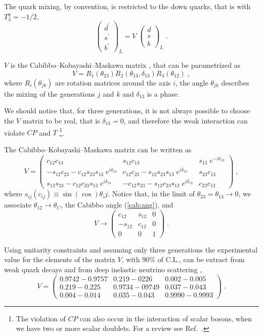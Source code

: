 \documentclass[12pt]{report}
\newcommand{\ba}{\begin{array}}
\newcommand{\ea}{\end{array}}
\begin{document}

The quark mixing, by convention, is restricted to the down quarks,
that is  with $T_3^q = -1/2$,
\[
\left( \ba{c}
d^\prime\\
s^\prime\\
b^\prime
\ea \right)_L  = V \; \left( \ba{c}
	      			d\\
	      	 		s\\
				b
             			 \ea \right)_L \; .
\]

$V$ is the Cabibbo--Kobayashi--Maskawa matrix
\cite{Cabibbo:63,Kobayashi:73}, that can be parame\-tri\-zed as
\[
V = R_1 (\theta_{23}) R_2(\theta_{13}, \delta_{13}) R_3(\theta_{12})
\; ,
\]
where $R_i(\theta_{jk})$ are rotation matrices around the axis $i$, 
the angle $\theta_{jk}$ describes the mixing of the generations $j$
and $k$ and $\delta_{13}$ is a phase. 

We should notice that, for three generations, it is not always
possible to choose the $V$ matrix to be real, that is $\delta_{13}
=0$, and therefore the weak interaction can violate $CP$ and $T$
\footnote{The violation of $CP$ can also occur in the interaction of
scalar bosons, when we have two or more scalar doublets. For a review
see Ref.\ \cite{Winstein:93}.}.

The Cabibbo--Kobayashi--Maskawa matrix can be written as
\[
V = \left( \ba{ccc}
 c_{12}c_{13}						&  
 s_{12}c_{13}						&   
 s_{13} \; e^{-i\delta_{13}}				\\
-s_{12}c_{23} - c_{12}s_{23}s_{13} \; e^{i\delta_{13}} 	& 
 c_{12}c_{23} - s_{12}s_{23}s_{13} \; e^{i\delta_{13}}	& 
 s_{23}c_{13}						\\
 s_{12}s_{23} - c_{12}c_{23}s_{13} \; e^{i\delta_{13}} 	&
-c_{12}s_{23} - s_{12}c_{23}s_{13} \; e^{i\delta_{13}}	&  
 c_{23}c_{13}	 
\ea \right) \; ,
\]
where $s_{ij}(c_{ij}) \equiv \sin (\cos) \theta_ij$. Notice that, in
the limit of $\theta_{23} = \theta_{13} \to 0$, we associate
$\theta_{12} \to \theta_{C}$, the Cabibbo angle (\ref{cab:ang}), and
\[
V \to 
\left( \ba{ccc}
 c_{12}		&  
 s_{12}		&   
 0		\\
-s_{12}  	& 
 c_{12}  	& 
 0		\\
 0		&
 0 		&  
 1	 
\ea \right) \; .
\]

Using unitarity constraints and assuming only three generations the
experimental value for the elements of the matrix $V$, with 90\% of
C.L., can be extract from weak quark decays and from deep inelastic
neutrino scattering \cite{pdg:98},
\[
V = \left( \ba{ccc}
 0.9742-0.9757	&  
 0.219-0226	&   
 0.002-0.005	\\
 0.219-0.225	& 
 0.9734-09749	& 
 0.037-0.043	\\
 0.004-0.014	&
 0.035-0.043	&  
 0.9990-0.9993	 
\ea \right) \; .
\]
\end{document}
